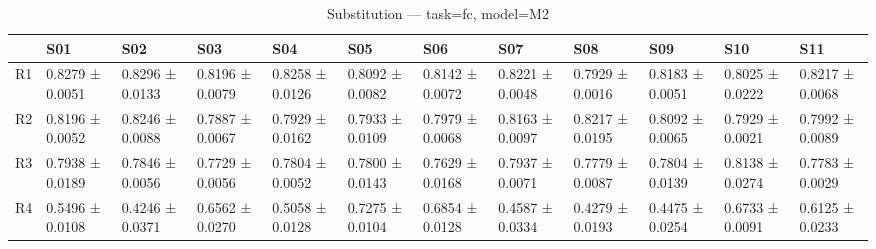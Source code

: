 \begin{table}[htbp]
\centering
\caption{Substitution — task=fc, model=M2}
\label{tab:sub:fc:M2}
\begin{tabular}{llllllllllll}
\toprule
\toprule
 & S01 & S02 & S03 & S04 & S05 & S06 & S07 & S08 & S09 & S10 & S11 \\
\midrule
\midrule
R1 & 0.8279 ± 0.0051 & 0.8296 ± 0.0133 & 0.8196 ± 0.0079 & 0.8258 ± 0.0126 & 0.8092 ± 0.0082 & 0.8142 ± 0.0072 & 0.8221 ± 0.0048 & 0.7929 ± 0.0016 & 0.8183 ± 0.0051 & 0.8025 ± 0.0222 & 0.8217 ± 0.0068 \\
R2 & 0.8196 ± 0.0052 & 0.8246 ± 0.0088 & 0.7887 ± 0.0067 & 0.7929 ± 0.0162 & 0.7933 ± 0.0109 & 0.7979 ± 0.0068 & 0.8163 ± 0.0097 & 0.8217 ± 0.0195 & 0.8092 ± 0.0065 & 0.7929 ± 0.0021 & 0.7992 ± 0.0089 \\
R3 & 0.7938 ± 0.0189 & 0.7846 ± 0.0056 & 0.7729 ± 0.0056 & 0.7804 ± 0.0052 & 0.7800 ± 0.0143 & 0.7629 ± 0.0168 & 0.7937 ± 0.0071 & 0.7779 ± 0.0087 & 0.7804 ± 0.0139 & 0.8138 ± 0.0274 & 0.7783 ± 0.0029 \\
R4 & 0.5496 ± 0.0108 & 0.4246 ± 0.0371 & 0.6562 ± 0.0270 & 0.5058 ± 0.0128 & 0.7275 ± 0.0104 & 0.6854 ± 0.0128 & 0.4587 ± 0.0334 & 0.4279 ± 0.0193 & 0.4475 ± 0.0254 & 0.6733 ± 0.0091 & 0.6125 ± 0.0233 \\
\bottomrule
\end{tabular}\end{table}
